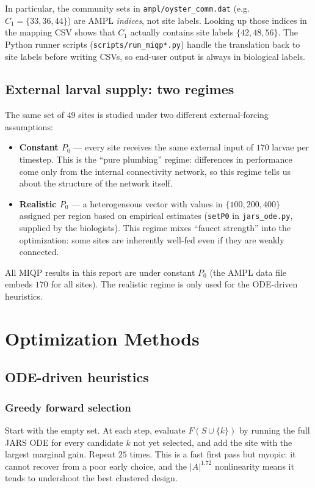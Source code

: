 \documentclass[11pt]{article}
\begin{document}
In particular, the community sets in \texttt{ampl/oyster\_comm.dat} (e.g.\ $C_1 = \{33, 36, 44\}$) are AMPL \emph{indices}, not site labels. Looking up those indices in the mapping CSV shows that $C_1$ actually contains site labels $\{42, 48, 56\}$. The Python runner scripts (\texttt{scripts/run\_miqp*.py}) handle the translation back to site labels before writing CSVs, so end-user output is always in biological labels.

\subsection{External larval supply: two regimes}

The same set of $49$ sites is studied under two different external-forcing assumptions:

\begin{itemize}[leftmargin=1.4em, itemsep=0.2em]
  \item \textbf{Constant $P_0$} --- every site receives the same external input of $170$ larvae per timestep. This is the ``pure plumbing'' regime: differences in performance come only from the internal connectivity network, so this regime tells us about the structure of the network itself.
  \item \textbf{Realistic $P_0$} --- a heterogeneous vector with values in $\{100, 200, 400\}$ assigned per region based on empirical estimates (\texttt{setP0} in \texttt{jars\_ode.py}, supplied by the biologists). This regime mixes ``faucet strength'' into the optimization: some sites are inherently well-fed even if they are weakly connected.
\end{itemize}

All MIQP results in this report are under constant $P_0$ (the AMPL data file embeds $170$ for all sites). The realistic regime is only used for the ODE-driven heuristics.

\section{Optimization Methods}

\subsection{ODE-driven heuristics}

\subsubsection*{Greedy forward selection}
Start with the empty set. At each step, evaluate $F(S \cup \{k\})$ by running the full JARS ODE for every candidate $k$ not yet selected, and add the site with the largest marginal gain. Repeat $25$ times. This is a fast first pass but myopic: it cannot recover from a poor early choice, and the $|A|^{1.72}$ nonlinearity means it tends to undershoot the best clustered design.
\end{document}
